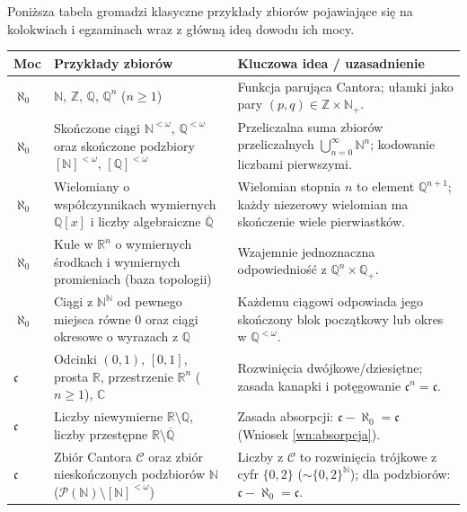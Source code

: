 \documentclass[11pt, a4paper]{article}
\theoremstyle{definition}
\theoremstyle{plain}
\theoremstyle{remark}
\begin{document}
Poniższa tabela gromadzi klasyczne przykłady zbiorów pojawiające się na kolokwiach i egzaminach wraz z główną ideą dowodu ich mocy.

\begin{center}
\small
\begin{tabularx}{\textwidth}{l X X}
\toprule
\textbf{Moc} & \textbf{Przykłady zbiorów} & \textbf{Kluczowa idea / uzasadnienie} \\
\midrule
$\aleph_0$ & $\mathbb{N}$, $\mathbb{Z}$, $\mathbb{Q}$, $\mathbb{Q}^n$ ($n \ge 1$) & Funkcja parująca Cantora; ułamki jako pary $(p, q) \in \mathbb{Z} \times \mathbb{N}_+$. \\
\addlinespace[3pt]
$\aleph_0$ & Skończone ciągi $\mathbb{N}^{<\omega}$, $\mathbb{Q}^{<\omega}$ oraz skończone podzbiory $[\mathbb{N}]^{<\omega}$, $[\mathbb{Q}]^{<\omega}$ & Przeliczalna suma zbiorów przeliczalnych $\bigcup_{n=0}^{\infty} \mathbb{N}^n$; kodowanie liczbami pierwszymi. \\
\addlinespace[3pt]
$\aleph_0$ & Wielomiany o współczynnikach wymiernych $\mathbb{Q}[x]$ i liczby algebraiczne $\overline{\mathbb{Q}}$ & Wielomian stopnia $n$ to element $\mathbb{Q}^{n+1}$; każdy niezerowy wielomian ma skończenie wiele pierwiastków. \\
\addlinespace[3pt]
$\aleph_0$ & Kule w $\mathbb{R}^n$ o wymiernych środkach i wymiernych promieniach (baza topologii) & Wzajemnie jednoznaczna odpowiedniość z $\mathbb{Q}^n \times \mathbb{Q}_+$. \\
\addlinespace[3pt]
$\aleph_0$ & Ciągi z $\mathbb{N}^{\mathbb{N}}$ od pewnego miejsca równe $0$ oraz ciągi okresowe o wyrazach z $\mathbb{Q}$ & Każdemu ciągowi odpowiada jego skończony blok początkowy lub okres w $\mathbb{Q}^{<\omega}$. \\
\midrule
$\mathfrak{c}$ & Odcinki $(0, 1)$, $[0, 1]$, prosta $\mathbb{R}$, przestrzenie $\mathbb{R}^n$ ($n \ge 1$), $\mathbb{C}$ & Rozwinięcia dwójkowe/dziesiętne; zasada kanapki i potęgowanie $\mathfrak{c}^n = \mathfrak{c}$. \\
\addlinespace[3pt]
$\mathfrak{c}$ & Liczby niewymierne $\mathbb{R} \setminus \mathbb{Q}$, liczby przestępne $\mathbb{R} \setminus \overline{\mathbb{Q}}$ & Zasada absorpcji: $\mathfrak{c} - \aleph_0 = \mathfrak{c}$ (Wniosek \ref{wn:absorpcja}). \\
\addlinespace[3pt]
$\mathfrak{c}$ & Zbiór Cantora $\mathcal{C}$ oraz zbiór nieskończonych podzbiorów $\mathbb{N}$ ($\mathcal{P}(\mathbb{N}) \setminus [\mathbb{N}]^{<\omega}$) & Liczby z $\mathcal{C}$ to rozwinięcia trójkowe z cyfr $\{0, 2\}$ ($\sim \{0,2\}^{\mathbb{N}}$); dla podzbiorów: $\mathfrak{c} - \aleph_0 = \mathfrak{c}$. \\

\end{tabularx}
\end{center}
\end{document}
